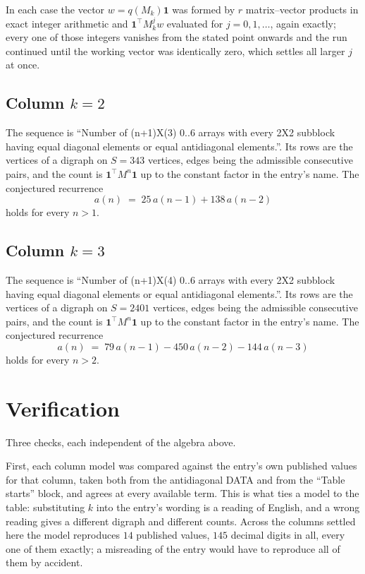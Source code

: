 \documentclass[11pt,a4paper]{article}
\theoremstyle{plain}
\theoremstyle{definition}
\begin{document}
In each case the vector $w=q(M_k)\mathbf{1}$ was formed by $r$ matrix--vector products in
exact integer arithmetic and $\mathbf{1}^{\!\top}M_k^{j}w$ evaluated for $j=0,1,\dots$,
again exactly; every one of those integers vanishes from the stated point onwards and the run
continued until the working vector was identically zero, which settles all larger $j$ at once.

\subsection*{Column $k=2$}
The sequence is ``Number of (n+1)X(3) 0..6 arrays with every 2X2 subblock having equal diagonal elements or equal antidiagonal elements.''. Its rows are the vertices of a digraph on
$S=343$ vertices, edges being the admissible consecutive pairs, and the count is
$\mathbf{1}^{\!\top}M^{n}\mathbf{1}$ up to the constant factor in the entry's name.
The conjectured recurrence
\[
a(n)\;=\;25\,a(n-1) + 138\,a(n-2)
\]
holds for every $n>1$.

\subsection*{Column $k=3$}
The sequence is ``Number of (n+1)X(4) 0..6 arrays with every 2X2 subblock having equal diagonal elements or equal antidiagonal elements.''. Its rows are the vertices of a digraph on
$S=2401$ vertices, edges being the admissible consecutive pairs, and the count is
$\mathbf{1}^{\!\top}M^{n}\mathbf{1}$ up to the constant factor in the entry's name.
The conjectured recurrence
\[
a(n)\;=\;79\,a(n-1) - 450\,a(n-2) - 144\,a(n-3)
\]
holds for every $n>2$.

\section{Verification}

Three checks, each independent of the algebra above.

First, each column model was compared against the entry's own published values for that
column, taken both from the antidiagonal DATA and from the ``Table starts'' block, and agrees
at every available term. This is what ties a model to the table: substituting $k$ into the
entry's wording is a reading of English, and a wrong reading gives a different digraph and
different counts. Across the columns settled here the model reproduces $14$ published
values, $145$ decimal digits in all, every one of them exactly; a misreading of the entry
would have to reproduce all of them by accident.
\end{document}
